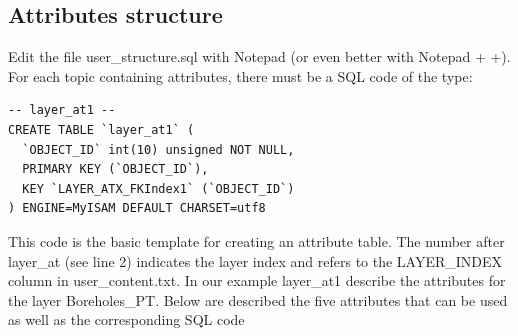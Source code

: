 \documentclass[a4paper, 12pt]{article}
\begin{document}
\subsection{Attributes structure}
Edit the file user\_structure.sql with Notepad (or even better with Notepad + +). For each topic containing attributes, there must be a SQL code of the type:

\begin{lstlisting}
-- layer_at1 --
CREATE TABLE `layer_at1` (
  `OBJECT_ID` int(10) unsigned NOT NULL,
  PRIMARY KEY (`OBJECT_ID`),
  KEY `LAYER_ATX_FKIndex1` (`OBJECT_ID`)
) ENGINE=MyISAM DEFAULT CHARSET=utf8
\end{lstlisting}
This code is the basic template for creating an attribute table. The number after layer\_at (see line 2) indicates the layer index and refers to the LAYER\_INDEX column in user\_content.txt. In our example layer\_at1 describe the attributes for the layer Boreholes\_PT.
Below are described the five attributes that can be used as well as the corresponding SQL code
\end{document}

